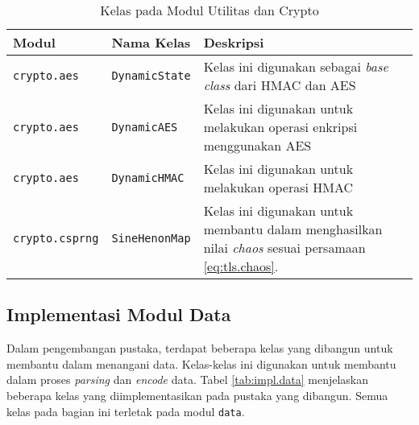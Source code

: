 \begin{table}[!h]
  \centering
  \caption{Kelas pada Modul Utilitas dan Crypto} \label{tab:impl.util.crypto}
  \begin{tabular}{|p{2.75cm}|p{3.5cm}|p{8cm}|}
    \hline
    Modul & Nama Kelas & Deskripsi \\ \hline
    \texttt{crypto.aes} & \texttt{DynamicState} & Kelas ini digunakan sebagai \emph{base class} dari HMAC dan AES \\ \hline
    \texttt{crypto.aes} & \texttt{DynamicAES} & Kelas ini digunakan untuk melakukan operasi enkripsi menggunakan AES\\ \hline
    \texttt{crypto.aes} & \texttt{DynamicHMAC} & Kelas ini digunakan untuk melakukan operasi HMAC\\ \hline
    \texttt{crypto.csprng} & \texttt{SineHenonMap} & Kelas ini digunakan untuk membantu dalam menghasilkan nilai \emph{chaos} sesuai persamaan \ref{eq:tls.chaos}.\\ \hline
  \end{tabular}
\end{table}

\subsection{Implementasi Modul Data}

Dalam pengembangan pustaka, terdapat beberapa kelas yang dibangun untuk membantu dalam menangani data. Kelas-kelas ini digunakan untuk membantu dalam proses \emph{parsing} dan \emph{encode} data. Tabel \ref{tab:impl.data} menjelaskan beberapa kelas yang diimplementasikan pada pustaka yang dibangun. Semua kelas pada bagian ini terletak pada modul \texttt{data}.

